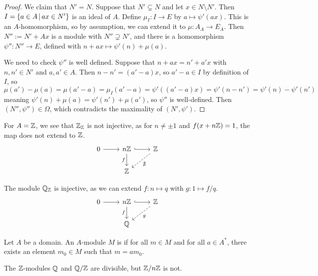 \begin{proof}
  We claim that $N' = N$.
  Suppose that $N' \subsetneq N$ and let $x \in N \setminus N'$.
  Then $I = \{ a \in A \,|\, ax \in N' \}$ is an ideal of $A$.
  Define $\mu_I : I \to E$ by $a \mapsto \psi'(ax)$.
  This is an $A$-homomorphism, so by assumption, we can extend it to $\mu:
  A_A \to E_A$.
  Then $N'' := N' + Ax$ is a module with $N'' \supsetneq N'$, and there is a
  homomorphism $\psi'': N'' \to E$, defined with $n + ax \mapsto \psi'(n) +
  \mu(a)$.

  We need to check $\psi''$ is well defined.
  Suppose that $n + ax = n' + a' x$ with $n, n' \in N'$ and $a, a' \in A$.
  Then $n - n' = (a'-a)x$, so $a' - a \in I$ by definition of $I$, so
  \[
	\mu(a') - \mu(a)
	= \mu(a' - a)
	= \mu_I(a' - a)
	= \psi'((a'-a)x)
	= \psi'(n - n')
	= \psi'(n) - \psi'(n')
  \]
  meaning $\psi'(n) + \mu(a) = \psi'(n') + \mu(a')$, so $\psi''$ is
  well-defined.
  Then $(N'', \psi'') \in \Omega$, which contradicts the maximality of $(N',
  \psi')$.
\end{proof}

\begin{example}
  For $A = \mathbb{Z}$, we see that $\mathbb{Z}_{\mathbb{Z}}$ is not injective, as for $n \ne \pm 1$ and
  $f(x + n \mathbb{Z}) = 1$, the map does not extend to $\mathbb{Z}$.
  \[\begin{tikzcd}
	  0 & {n\Z} & \Z \\
	  & \Z
	  \arrow[from=1-1, to=1-2]
	  \arrow[hook, from=1-2, to=1-3]
	  \arrow["f"', from=1-2, to=2-2]
	  \arrow["\nexists", dashed, from=1-3, to=2-2]
	\end{tikzcd}\]
\end{example}

\begin{example}
  The module $\mathbb{Q}_{\mathbb{Z}}$ is injective, as we can extend $f: n \mapsto q$ with $g: 1
  \mapsto f / q$.
  \[\begin{tikzcd}
	  0 & {n \Z} & \Z \\
	  & \Q
	  \arrow[from=1-1, to=1-2]
	  \arrow[hook, from=1-2, to=1-3]
	  \arrow["f"', from=1-2, to=2-2]
	  \arrow["g", dashed, from=1-3, to=2-2]
	\end{tikzcd}\]
\end{example}

\begin{definition}
  Let $A$ be a domain.
  An $A$-module $M$ is  if for all $m \in M$ and for all $a \in
  A^*$, there exists an element $m_0 \in M$ such that $m = a m_0$.
\end{definition}

\begin{example}
  The $\mathbb{Z}$-modules $\mathbb{Q}$ and $\mathbb{Q} / \mathbb{Z}$ are divisible, but $\mathbb{Z} / n \mathbb{Z}$ is not.
\end{example}

